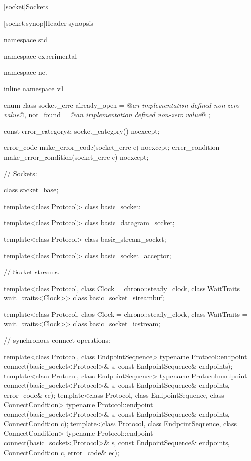 
[socket]{Sockets}


%
[socket.synop]{Header  synopsis}

%
\begin{codeblock}
namespace std {
namespace experimental {
namespace net {
inline namespace v1 {

  enum class socket_errc {
    already_open = @\textit{an implementation defined non-zero value}@,
    not_found = @\textit{an implementation defined non-zero value}@
  };

  const error_category& socket_category() noexcept;

  error_code make_error_code(socket_errc e) noexcept;
  error_condition make_error_condition(socket_errc e) noexcept;

  // Sockets:

  class socket_base;

  template<class Protocol>
    class basic_socket;

  template<class Protocol>
    class basic_datagram_socket;

  template<class Protocol>
    class basic_stream_socket;

  template<class Protocol>
    class basic_socket_acceptor;

  // Socket streams:

  template<class Protocol, class Clock = chrono::steady_clock,
    class WaitTraits = wait_traits<Clock>>
      class basic_socket_streambuf;

  template<class Protocol, class Clock = chrono::steady_clock,
    class WaitTraits = wait_traits<Clock>>
      class basic_socket_iostream;

  // synchronous connect operations:

  template<class Protocol, class EndpointSequence>
    typename Protocol::endpoint connect(basic_socket<Protocol>& s,
                                        const EndpointSequence& endpoints);
  template<class Protocol, class EndpointSequence>
    typename Protocol::endpoint connect(basic_socket<Protocol>& s,
                                        const EndpointSequence& endpoints,
                                        error_code& ec);
  template<class Protocol, class EndpointSequence, class ConnectCondition>
    typename Protocol::endpoint connect(basic_socket<Protocol>& s,
                                        const EndpointSequence& endpoints,
                                        ConnectCondition c);
  template<class Protocol, class EndpointSequence, class ConnectCondition>
    typename Protocol::endpoint connect(basic_socket<Protocol>& s,
                                        const EndpointSequence& endpoints,
                                        ConnectCondition c,
                                        error_code& ec);

}}}}
\end{codeblock}
